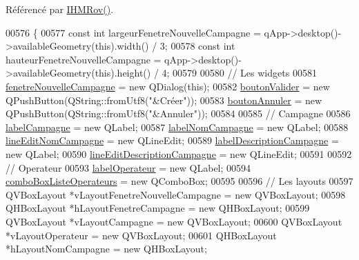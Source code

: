 Référencé par \hyperlink{class_i_h_m_rov_a5dac1fb4612866cc61f699a415e0ef6b}{I\+H\+M\+Rov()}.


\begin{DoxyCode}
00576 \{
00577     \textcolor{keyword}{const} \textcolor{keywordtype}{int} largeurFenetreNouvelleCampagne = qApp->desktop()->availableGeometry(\textcolor{keyword}{this}).width() / 3;
00578     \textcolor{keyword}{const} \textcolor{keywordtype}{int} hauteurFenetreNouvelleCampagne = qApp->desktop()->availableGeometry(\textcolor{keyword}{this}).height() / 4;
00579 
00580     \textcolor{comment}{// Les widgets}
00581     \hyperlink{class_i_h_m_rov_a13c12a93de7fc77c32f0108ae73cec06}{fenetreNouvelleCampagne} = \textcolor{keyword}{new} QDialog(\textcolor{keyword}{this});
00582     \hyperlink{class_i_h_m_rov_a4294b6c808089083906fb0815d1c9c27}{boutonValider} = \textcolor{keyword}{new} QPushButton(QString::fromUtf8(\textcolor{stringliteral}{"&Créer"}));
00583     \hyperlink{class_i_h_m_rov_a4a6fec1b4a86c93c1d0d62d66804db5c}{boutonAnnuler} = \textcolor{keyword}{new} QPushButton(QString::fromUtf8(\textcolor{stringliteral}{"&Annuler"}));
00584 
00585     \textcolor{comment}{// Campagne}
00586     \hyperlink{class_i_h_m_rov_a3ae7bec5b8f85f779ab58ba60556b37f}{labelCampagne} = \textcolor{keyword}{new} QLabel;
00587     \hyperlink{class_i_h_m_rov_a723334735d6a20ea43f79567892cfd25}{labelNomCampagne} = \textcolor{keyword}{new} QLabel;
00588     \hyperlink{class_i_h_m_rov_a3b3dac7166ab414832dea0b5ad1a570d}{lineEditNomCampagne} = \textcolor{keyword}{new} QLineEdit;
00589     \hyperlink{class_i_h_m_rov_addac593dfa0ea112cf4cc1b3837ca5e0}{labelDescriptionCampagne} = \textcolor{keyword}{new} QLabel;
00590     \hyperlink{class_i_h_m_rov_aedf9fd0d893326f970aa1b73dbe06e85}{lineEditDescriptionCampagne} = \textcolor{keyword}{new} QLineEdit;
00591 
00592     \textcolor{comment}{// Operateur}
00593     \hyperlink{class_i_h_m_rov_a1855235995ed076748b568a1702355c9}{labelOperateur} = \textcolor{keyword}{new} QLabel;
00594     \hyperlink{class_i_h_m_rov_a32ee4423982fa3a78e59167ed2354f6e}{comboBoxListeOperateurs} = \textcolor{keyword}{new} QComboBox;
00595 
00596     \textcolor{comment}{// Les layouts}
00597     QVBoxLayout *vLayoutFenetreNouvelleCampagne = \textcolor{keyword}{new} QVBoxLayout;
00598     QHBoxLayout *hLayoutFenetreCampagne = \textcolor{keyword}{new} QHBoxLayout;
00599     QVBoxLayout *vLayoutCampagne = \textcolor{keyword}{new} QVBoxLayout;
00600     QVBoxLayout *vLayoutOperateur = \textcolor{keyword}{new} QVBoxLayout;
00601     QHBoxLayout *hLayoutNomCampagne = \textcolor{keyword}{new} QHBoxLayout;

\end{DoxyCode}
